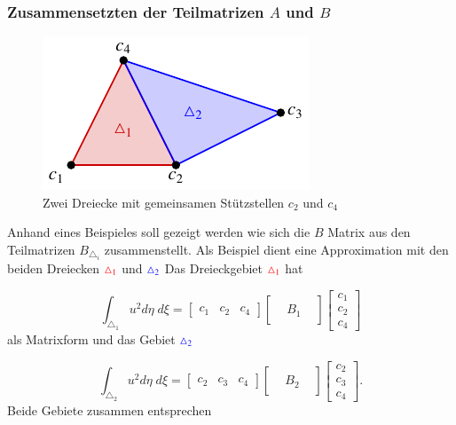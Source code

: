 \subsubsection{Zusammensetzten der Teilmatrizen $A$ und $B$}
\begin{figure}
\centering
\includegraphics{papers/fem/Images/dreiecke.pdf}
\caption{Zwei Dreiecke mit gemeinsamen Stützstellen $c_2$ und $c_4$ }
\end{figure}
Anhand eines Beispieles soll gezeigt werden wie sich die $B$ Matrix aus den Teilmatrizen $B_{\triangle_i}$ zusammenstellt.
Als Beispiel dient eine Approximation mit den beiden Dreiecken $\textcolor{red}{\triangle_1}$ und $\textcolor{blue}{\triangle_2}$
Das Dreieckgebiet $\textcolor{red}{\triangle_1}$ hat

\begin{equation}
\int_{\triangle_1} u^2 d\eta \; d\xi = \begin{bmatrix}
c_1 &  c_2 &  c_4  
\end{bmatrix}
\begin{bmatrix}
 & &      \\
 & B_1 &   \\
 &  & 
\end{bmatrix}
\begin{bmatrix}
c_1  \\
c_2 \\
c_4
\end{bmatrix}
\end{equation}
als Matrixform und das Gebiet $\textcolor{blue}{\triangle_2}$

\begin{equation}
\int_{\triangle_2} u^2 d\eta \; d\xi = \begin{bmatrix}
c_2 &  c_3 &  c_4  
\end{bmatrix}
\begin{bmatrix}
 & &      \\
 & B_2 &   \\
 &  & 
\end{bmatrix}
\begin{bmatrix}
c_2  \\
c_3 \\
c_4
\end{bmatrix}.
\end{equation}
Beide Gebiete zusammen entsprechen 


